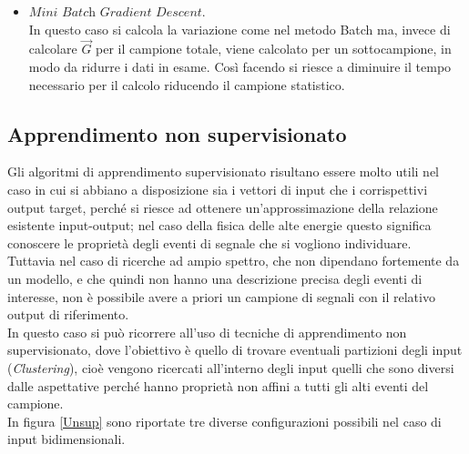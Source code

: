 \begin{itemize}
	\item $\textit{Mini Batch Gradient Descent}$. \\
	In questo caso si calcola la variazione come nel metodo Batch ma, invece di calcolare $\vec{G}$ per il campione totale, viene calcolato per un sottocampione, in modo da ridurre i dati in esame. Così facendo si riesce a diminuire il tempo necessario per il calcolo riducendo il campione statistico.
	
\end{itemize}

\newpage


\subsection{Apprendimento non supervisionato}
\label{app_non_sup}

Gli algoritmi di apprendimento supervisionato risultano essere molto utili nel caso in cui si abbiano a disposizione sia i vettori di input che i corrispettivi output target, perché si riesce ad ottenere un'approssimazione della relazione esistente input-output; nel caso della fisica delle alte energie questo significa conoscere le proprietà degli eventi di segnale che si vogliono individuare.\\
Tuttavia nel caso di ricerche ad ampio spettro, che non dipendano fortemente da un modello, e che quindi non hanno una descrizione precisa degli eventi di interesse, non è possibile avere a priori un campione di segnali con il relativo output di riferimento. \\
In questo caso si può ricorrere all'uso di tecniche di apprendimento non supervisionato, dove l'obiettivo è quello di trovare eventuali partizioni degli input (\textit{Clustering}), cioè vengono ricercati all'interno degli input quelli che sono diversi dalle aspettative perché hanno proprietà non affini a tutti gli alti eventi del campione. \\
In figura \ref{Unsup} sono riportate tre diverse configurazioni possibili nel caso di input bidimensionali.

